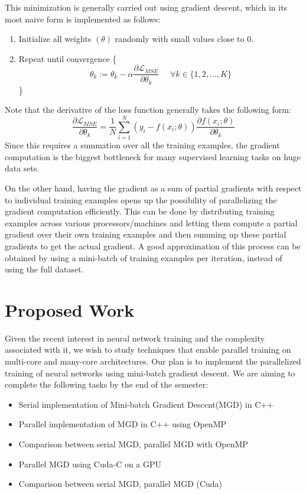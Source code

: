 \documentclass[11pt,letterpaper]{article}
\begin{document}
This minimization is generally carried out using gradient descent, which in its most naive form is implemented as follows:
\begin{enumerate}
\item Initialize all weights $(\theta)$ randomly with small values close to 0.
\item Repeat until convergence \{
\begin{equation*}
\theta_k := \theta_k - \alpha \frac{\partial \mathcal{L}_{MSE}}{\partial \theta_k} \hspace{16pt} \forall k \in \{1,2,...,K\}
\end{equation*}
\}
\end{enumerate}
Note that the derivative of the loss function generally takes the following form:
\begin{equation*}
\frac{\partial \mathcal{L}_{MSE}}{\partial \theta_k} = \frac{1}{N} \sum_{i=1}^N ( y_i - f(x_i; \theta)) \frac{\partial f(x_i; \theta)}{\partial \theta_k}
\end{equation*}
Since this requires a summation over all the training examples, the gradient computation is the biggest bottleneck for many supervised learning tasks on huge data sets.

On the other hand, having the gradient as a sum of partial gradients with respect to individual training examples opens up the possibility of parallelizing the gradient computation efficiently.
This can be done by distributing training examples across various processors/machines and letting them compute a partial gradient over their own training examples and then summing up these partial gradients to get the actual gradient.
A good approximation of this process can be obtained by using a mini-batch of training examples per iteration, instead of using the full dataset.

\section{Proposed Work}

Given the recent interest in neural network training and the complexity associated with it, we wish to study techniques that enable parallel training on multi-core and many-core architectures.
Our plan is to implement the parallelized training of neural networks using mini-batch gradient descent.
We are aiming to complete the following tasks by the end of the semester: 
\begin{itemize}
    \item Serial implementation of Mini-batch Gradient Descent(MGD) in C++
    \item Parallel implementation of MGD in C++ using OpenMP
    \item Comparison between serial MGD, parallel MGD with OpenMP%
    \item Parallel MGD using Cuda-C on a GPU
    \item Comparison between serial MGD, parallel MGD (Cuda)%
\end{itemize}
\end{document}
